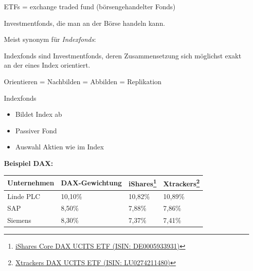 \documentclass{beamer}
\begin{document}
			\begin{frame}
				ETFs = exchange traded fund (börsengehandelter Fonds)
				\begin{definition}
					Investmentfonds, die man an der Börse handeln kann.
				\end{definition}
				Meist synonym für \textit{Indexfonds}:\pause
				\begin{definition}
					Indexfonds sind Investmentfonds, deren Zusammensetzung sich möglichst exakt an der eines Index orientiert.\citewiki{Indexfonds}
				\end{definition}
				Orientieren = Nachbilden = Abbilden = Replikation
			\end{frame}
		
			\begin{frame}{Indexfonds}
				\begin{itemize}
					\item Bildet Index ab
					\item Passiver Fond
					\item Auswahl Aktien wie im Index
				\end{itemize}\vspace{0.25cm}
				\textbf{Beispiel DAX:}\vspace{0.25cm}
				\begin{tabularx}{\linewidth}{X|p{3cm}|X|X}
					Unternehmen & DAX-Gewichtung & iShares\footnote{\href{https://de.extraetf.com/etf-profile/DE0005933931?tab=components}{iShares Core DAX UCITS ETF (ISIN: DE0005933931)}} & Xtrackers\footnote{\href{https://de.extraetf.com/etf-profile/LU0274211480?tab=components}{Xtrackers DAX UCITS ETF (ISIN: LU0274211480)}}\\
					\hline
					Linde PLC & 10,10\% & 10,82\% & 10,89\% \\
					SAP & 8,50\% & 7,88\% & 7,86\%\\
					Siemens & 8,30\% & 7,37\% & 7,41\%
				\end{tabularx}
			\end{frame}
		
\end{document}
